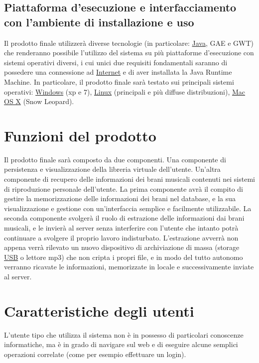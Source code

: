 \subsection{Piattaforma d'esecuzione e interfacciamento con l'ambiente di
installazione e uso}
Il prodotto finale utilizzer\`a diverse tecnologie (in particolare: \underline{Java}, GAE e
GWT) che renderanno possibile l'utilizzo del sistema su pi\`u piattaforme
d'esecuzione con sistemi operativi diversi, i cui unici due requisiti
fondamentali saranno di possedere una connessione ad \underline{Internet} e di aver
installata la Java Runtime Machine. In particolare, il prodotto finale sar\`a
testato sui principali sistemi operativi: \underline{Windows} (xp e 7), \underline{Linux} (principali e
pi\`u diffuse distribuzioni), \underline{Mac OS X} (Snow Leopard).
\section{Funzioni del prodotto}
Il prodotto finale sar\`a composto da due componenti. Una componente di
persistenza e visualizzazione della libreria virtuale dell'utente. Un'altra
componente di recupero delle informazioni dei brani musicali contenuti nei
sistemi di riproduzione personale dell'utente. La prima componente avr\`a il
compito di gestire la memorizzazione delle informazioni dei brani nel database,
e la sua visualizzazione e gestione con un'interfaccia semplice e facilmente
utilizzabile. La seconda componente svolger\`a il ruolo di estrazione delle
informazioni dai brani musicali, e le invier\`a al server senza interferire con
l'utente che intanto potr\`a continuare a svolgere il proprio lavoro indisturbato.
L'estrazione avverr\`a non appena verr\`a rilevato un nuovo dispositivo di
archiviazione di massa (storage \underline{USB} o lettore mp3) che non cripta i
propri file, e in modo del tutto autonomo verranno ricavate le informazioni, memorizzate in
locale e successivamente inviate al server.

\section{Caratteristiche degli utenti}
L'utente tipo che utilizza il sistema non \`e in possesso di particolari
conoscenze informatiche, ma \`e in grado di navigare sul web e di eseguire alcune
semplici operazioni correlate (come per esempio effettuare un login).

